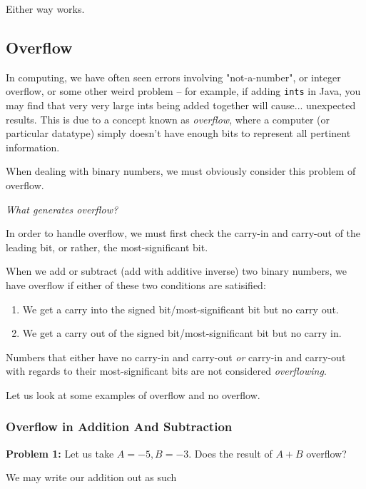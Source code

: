 \documentclass[12pt]{article}
\begin{document}
    Either way works.

    
        
    \subsection{Overflow}

    In computing, we have often seen errors involving "not-a-number", or integer overflow, or some other
    weird problem -- for example, if adding \texttt{ints} in Java, you may find that very very large ints
    being added together will cause... unexpected results. This is due to a concept known as \textit{overflow},
    where a computer (or particular datatype) simply doesn't have enough bits to represent all pertinent information.

    When dealing with binary numbers, we must obviously consider this problem of overflow.

    \textit{What generates overflow?}

    In order to handle overflow, we must first check the carry-in and carry-out of
    the leading bit, or rather, the most-significant bit.

    When we add or subtract (add with additive inverse) two binary numbers, we
    have overflow if either of these two conditions are satisified:

    \begin{enumerate}
        \item We get a carry into the signed bit/most-significant bit but no carry out.
        \item We get a carry out of the signed bit/most-significant bit but no carry in.
    \end{enumerate}

    Numbers that either have no carry-in and carry-out \textit{or} carry-in and carry-out with
    regards to their most-significant bits are not considered \textit{overflowing}.

    Let us look at some examples of overflow and no overflow.

    \subsubsection{Overflow in Addition And Subtraction}

    \textbf{Problem 1: } Let us take $A = -5, B = -3$. Does the result of $A + B$ overflow?

    We may write our addition out as such
\end{document}
